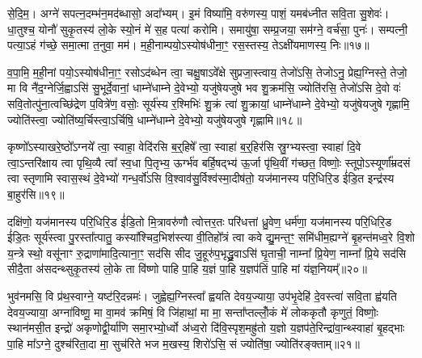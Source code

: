 से॒दि॒म॒। अग्ने॑ सपत्न॒दम्भ॑न॒मद॑ब्धासो॒ अदा᳚भ्यम्। इ॒मं विष्या॑मि॒ वरु॑णस्य॒ पाशं॒ यमब॑ध्नीत सवि॒ता सु॒शेवः॑। धा॒तुश्च॒ योनौ॑ सुकृ॒तस्य॑ लो॒के स्यो॒नं मे॑ स॒ह पत्या॑ करोमि। समायु॑षा॒ सम्प्र॒जया॒ सम॑ग्ने॒ वर्च॑सा॒ पुनः॑। सम्पत्नी॒ पत्या॒\-ऽहं ग॑च्छे॒ समा॒त्मा त॒नुवा॒ मम॑। म॒ही॒नाम्पयो॒\-ऽस्योष॑धीना॒ꣳ॒ रस॒स्तस्य॒ ते\-ऽक्षी॑यमाणस्य॒ निः॥१७॥

व॒पा॒मि॒ म॒ही॒नां पयो॒\-ऽस्योष॑धीना॒ꣳ॒ रसो\-ऽद॑ब्धेन त्वा॒ चक्षु॒षा\-ऽवे᳚क्षे सुप्रजा॒स्त्वाय॒ तेजो॑\-ऽसि॒ तेजो\-ऽनु॒ प्रेह्य॒ग्निस्ते॒ तेजो॒ मा वि नै॑द॒ग्नेर्जि॒ह्वा\-ऽसि॑ सु॒भूर्दे॒वानां॒ धाम्ने॑धाम्ने दे॒वेभ्यो॒ यजु॑षेयजुषे भव शु॒क्रम॑सि॒ ज्योति॑रसि॒ तेजो॑\-ऽसि दे॒वो वः॑ सवि॒तोत्पु॑ना॒त्वच्छि॑द्रेण प॒वित्रे॑ण॒ वसोः॒ सूर्य॑स्य र॒श्मिभिः॑ शु॒क्रं त्वा॑ शु॒क्रायां॒ धाम्ने॑धाम्ने दे॒वेभ्यो॒ यजु॑षेयजुषे गृह्णामि॒ ज्योति॑स्त्वा॒ ज्योति॑ष्य॒र्चिस्त्वा॒\-ऽर्चिषि॒ धाम्ने॑धाम्ने दे॒वेभ्यो॒ यजु॑षेयजुषे गृह्णामि॥१८॥

{\anuvakamend[{उप॒ नी र॒श्मिभिः॑ शु॒क्रꣳ षोड॑श च। (10)}]}

कृष्णो᳚\-ऽस्याखरे॒ष्ठो᳚\-ऽग्नये᳚ त्वा॒ स्वाहा॒ वेदि॑रसि ब॒र्॒हिषे᳚ त्वा॒ स्वाहा॑ ब॒र्॒हिर॑सि स्रु॒ग्भ्यस्त्वा॒ स्वाहा॑ दि॒वे त्वा॒\-ऽन्तरि॑क्षाय त्वा पृथि॒व्यै त्वा᳚ स्व॒धा पि॒तृभ्य॒ ऊर्ग्भ॑व बर्\mbox{}हि॒षद्भ्य॑ ऊ॒र्जा पृ॑थि॒वीं ग॑च्छत॒ विष्णोः॒ स्तूपो॒\-ऽस्यूर्णा᳚म्रदसं त्वा स्तृणामि स्वास॒स्थं दे॒वेभ्यो॑ गन्ध॒र्वो॑\-ऽसि वि॒श्वाव॑सु॒र्विश्व॑स्मा॒दीष॑तो॒ यज॑मानस्य परि॒धिरि॒ड ई॑डि॒त इन्द्र॑स्य बा॒हुर॑सि॥१९॥

दक्षि॑णो॒ यज॑मानस्य परि॒धिरि॒ड ई॑डि॒तो मि॒त्रावरु॑णौ त्वोत्तर॒तः परि॑धत्तां ध्रु॒वेण॒ धर्म॑णा॒ यज॑मानस्य परि॒धिरि॒ड ई॑डि॒तः सूर्य॑स्त्वा पु॒रस्ता᳚त्पातु॒ कस्या᳚श्चिद॒भिश॑स्त्या वी॒तिहो᳚त्रं त्वा कवे द्यु॒मन्त॒ꣳ॒ समि॑धीम॒ह्यग्ने॑ बृ॒हन्त॑मध्व॒रे वि॒शो य॒न्त्रे स्थो॒ वसू॑नाꣳ रु॒द्राणा॑मादि॒त्याना॒ꣳ॒ सद॑सि सीद जु॒हूरु॑प॒भृद्ध्रु॒वा\-ऽसि॑ घृ॒ताची॒ नाम्ना᳚ प्रि॒येण॒ नाम्ना᳚ प्रि॒ये सद॑सि सीदै॒ता अ॑सदन्थ्सुकृ॒तस्य॑ लो॒के ता वि॑ष्णो पाहि पा॒हि य॒ज्ञं पा॒हि य॒ज्ञप॑तिं पा॒हि मां य॑ज्ञ॒नियम्᳚॥२०॥

{\anuvakamend[{बा॒हुर॑सि प्रि॒ये सद॑सि पञ्च॑दश च। (11)}]}

भुव॑नमसि॒ वि प्र॑थ॒स्वाग्ने॒ यष्ट॑रि॒दन्नमः॑। जुह्वेह्य॒ग्निस्त्वा᳚ ह्वयति देवय॒ज्याया॒ उप॑भृ॒देहि॑ दे॒वस्त्वा॑ सवि॒ता ह्व॑यति देवय॒ज्याया॒ अग्ना॑विष्णू॒ मा वा॒मव॑ क्रमिषं॒ वि जि॑हाथां॒ मा मा॒ सन्ता᳚प्तल्लोँ॒कं मे॑ लोककृतौ कृणुतं॒ विष्णोः॒ स्थान॑मसी॒त इन्द्रो॑ अकृणोद्वी॒र्या॑णि समा॒रभ्यो॒र्ध्वो अ॑ध्व॒रो दि॑वि॒स्पृश॒मह्रु॑तो य॒ज्ञो य॒ज्ञप॑ते॒रिन्द्रा॑वा॒न्थ्स्वाहा॑ बृ॒हद्भाः पा॒हि मा᳚ऽग्ने॒ दुश्च॑रिता॒दा मा॒ सुच॑रिते भज म॒खस्य॒ शिरो॑\-ऽसि॒ सं ज्योति॑षा॒ ज्योति॑रङ्क्ताम्॥२१॥

